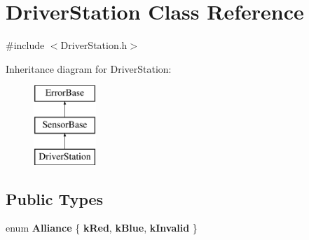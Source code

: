 \hypertarget{classDriverStation}{
\section{DriverStation Class Reference}
\label{classDriverStation}
}


{\ttfamily \#include $<$DriverStation.h$>$}

Inheritance diagram for DriverStation:\begin{figure}[H]
\begin{center}
\leavevmode
\includegraphics[height=3.000000cm]{classDriverStation}
\end{center}
\end{figure}
\subsection*{Public Types}
\begin{DoxyCompactItemize}
\item 
enum {\bfseries Alliance} \{ {\bfseries kRed}, 
{\bfseries kBlue}, 
{\bfseries kInvalid}
 \}
\end{DoxyCompactItemize}
